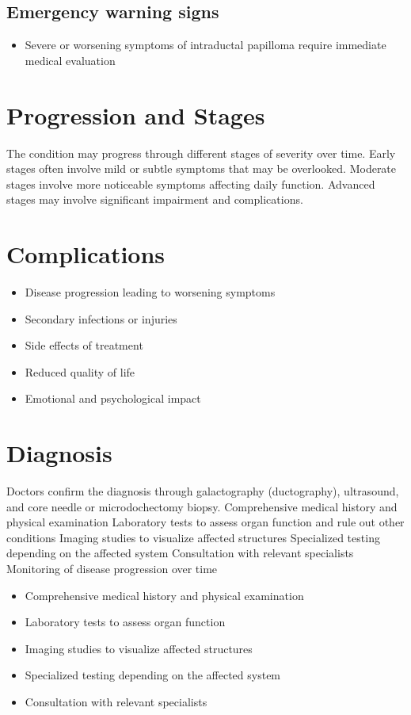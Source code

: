 \subsection{Emergency warning signs}
\begin{itemize}[noitemsep]
  \item Severe or worsening symptoms of intraductal papilloma require immediate medical evaluation
\end{itemize}
\section{Progression and Stages}
The condition may progress through different stages of severity over time. Early stages often involve mild or subtle symptoms that may be overlooked. Moderate stages involve more noticeable symptoms affecting daily function. Advanced stages may involve significant impairment and complications.
\section{Complications}
\begin{itemize}[noitemsep]
  \item Disease progression leading to worsening symptoms
  \item Secondary infections or injuries
  \item Side effects of treatment
  \item Reduced quality of life
  \item Emotional and psychological impact
\end{itemize}
\section{Diagnosis}
Doctors confirm the diagnosis through galactography (ductography), ultrasound, and core needle or microdochectomy biopsy. Comprehensive medical history and physical examination Laboratory tests to assess organ function and rule out other conditions Imaging studies to visualize affected structures Specialized testing depending on the affected system Consultation with relevant specialists Monitoring of disease progression over time

\begin{itemize}[noitemsep]
  \item Comprehensive medical history and physical examination
  \item Laboratory tests to assess organ function
  \item Imaging studies to visualize affected structures
  \item Specialized testing depending on the affected system
  \item Consultation with relevant specialists
\end{itemize}
